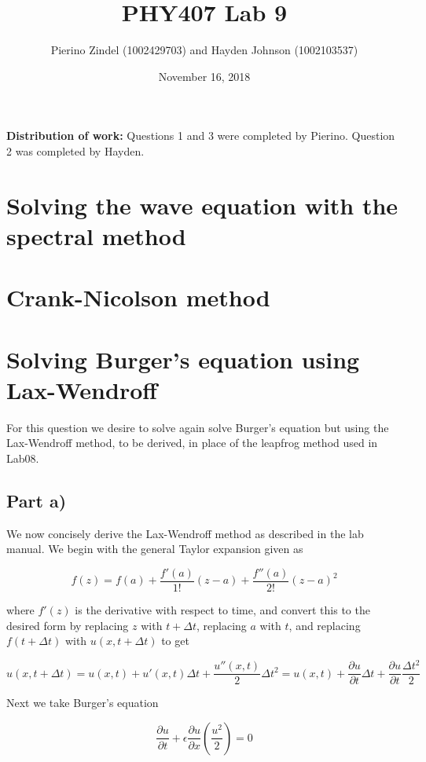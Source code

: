 \documentclass{article}
\title{PHY407 Lab 9}
\author{Pierino Zindel (1002429703) and Hayden Johnson (1002103537)}
\date{November 16, 2018}
\begin{document}
\maketitle

\noindent \textbf{Distribution of work:} Questions 1 and 3 were completed by Pierino. Question 2 was completed by Hayden.

\section{Solving the wave equation with the spectral method}

\section{Crank-Nicolson method}

\section{Solving Burger's equation using Lax-Wendroff}
For this question we desire to solve again solve Burger's equation but using the Lax-Wendroff method, to be derived, in place of the leapfrog method used in Lab08.

\subsection{Part a)}
We now concisely derive the Lax-Wendroff method as described in the lab manual. We begin with the general Taylor expansion given as 

\begin{equation}
	f(z) = f(a) + \frac{f'(a)}{1!}(z-a) + \frac{f''(a)}{2!}(z-a)^2
\end{equation}

where $f'(z)$ is the derivative with respect to time, and convert this to the desired form by replacing $z$ with $t+\Delta t$, replacing $a$ with $t$, and replacing $f(t+\Delta t)$ with $u(x, t+\Delta t)$ to get

\begin{equation}
	\label{eq:t-exp}
	u(x,t+\Delta t) = u(x,t) + u'(x,t)\Delta t + \frac{u''(x,t)}{2}\Delta t^2
	= u(x,t) + \frac{\partial u}{\partial t}\Delta t + \frac{\partial u}{\partial t}\frac{\Delta t^2}{2}
\end{equation}

Next we take Burger's equation

\begin{equation}
	\frac{\partial u}{\partial t}+\epsilon \frac{\partial u}{\partial x} \left(\frac{u^2}{2}\right) = 0
\end{equation}
\end{document}
